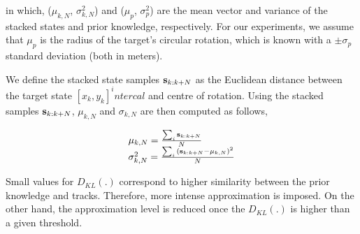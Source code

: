 \noindent in which, ($\mu_{k, N}$, $\sigma_{k, N}^2$) and ($\mu_p$, $\sigma_p^2$) are the mean vector and variance of the stacked states and prior knowledge, respectively. For our experiments, we assume that $\mu_p$ is the radius of the target's circular rotation, which is known with a $\pm \sigma_p$ standard deviation (both in meters).

We define the stacked state samples ${\bf s}_{k:k+N}$ as the Euclidean distance between the target state $[x_k, y_k]^intercal$ and centre of rotation.
Using the stacked samples ${\bf s}_{k:k+N}$, $\mu_{k, N}$ and $\sigma_{k, N}$ are then computed as follows,

\begin{equation}
\begin{array}{l}
\mu_{k, N} = \frac{\sum_{i}{{\bf s}_{k:k+N}}}{N} \\
\sigma_{k, N}^2 = \frac{\sum_{i}{({\bf s}_{k:k+N}} - \mu_{k, N})^2}{N}
\end{array}
\end{equation}

Small values for $D_{KL}(.)$ correspond to higher similarity between the prior knowledge and tracks. Therefore, more intense approximation is imposed. On the other hand, the approximation level is reduced once the $D_{KL}(.)$ is higher than a given threshold.